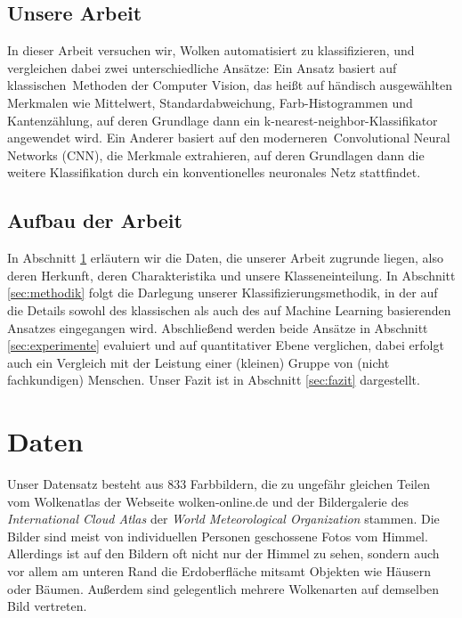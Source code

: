 \documentclass[a4,german]{article}
\begin{document}
\subsection{Unsere Arbeit}

In dieser Arbeit versuchen wir, Wolken automatisiert zu klassifizieren, und vergleichen dabei zwei unterschiedliche Ansätze:
Ein Ansatz basiert auf \glqq klassischen\grqq\ Methoden der Computer Vision, das heißt auf händisch ausgewählten Merkmalen wie Mittelwert, Standardabweichung, Farb-Histogrammen und Kantenzählung, auf deren Grundlage dann ein k-nearest-neighbor-Klassifikator angewendet wird.
Ein Anderer basiert auf den \glqq moderneren\grqq\ Convolutional Neural Networks (CNN), die Merkmale extrahieren, auf deren Grundlagen dann die weitere Klassifikation durch ein konventionelles neuronales Netz stattfindet.


\subsection{Aufbau der Arbeit}

In Abschnitt \ref{sec:daten} erläutern wir die Daten, die unserer Arbeit zugrunde liegen, also deren Herkunft, deren Charakteristika und unsere Klasseneinteilung.
In Abschnitt \ref{sec:methodik} folgt die Darlegung unserer Klassifizierungsmethodik, in der auf die Details sowohl des klassischen als auch des auf Machine Learning basierenden Ansatzes eingegangen wird.
Abschließend werden beide Ansätze in Abschnitt \ref{sec:experimente} evaluiert und auf quantitativer Ebene verglichen, dabei erfolgt auch ein Vergleich mit der Leistung einer (kleinen) Gruppe von (nicht fachkundigen) Menschen.
Unser Fazit ist in Abschnitt \ref{sec:fazit} dargestellt.


\section{Daten}
\label{sec:daten}

Unser Datensatz besteht aus 833 Farbbildern, die zu ungefähr gleichen Teilen vom Wolkenatlas der Webseite wolken-online.de \cite{wolkenonline} und der Bildergalerie des \emph{International Cloud Atlas} der \emph{World Meteorological Organization} \cite{wmo:images} stammen.
Die Bilder sind meist von individuellen Personen geschossene Fotos vom Himmel.
Allerdings ist auf den Bildern oft nicht nur der Himmel zu sehen, sondern auch vor allem am unteren Rand die Erdoberfläche mitsamt Objekten wie Häusern oder Bäumen.
Außerdem sind gelegentlich mehrere Wolkenarten auf demselben Bild vertreten.
\end{document}
